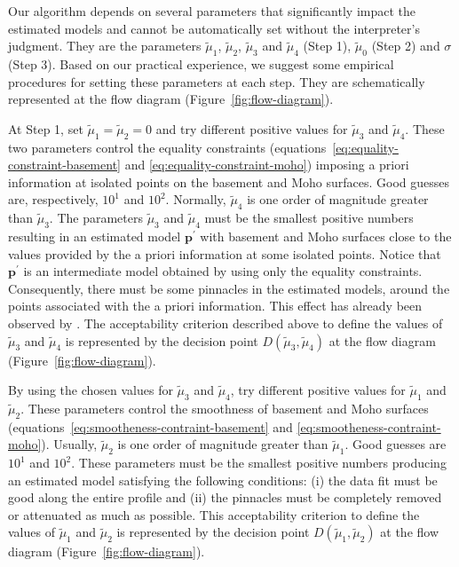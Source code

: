 \documentclass[manuscript,revised]{geophysics}
\begin{document}
Our algorithm depends on several parameters that significantly impact the estimated models
and cannot be automatically set without the interpreter’s judgment.
They are the parameters $\tilde{\mu}_{1}$, $\tilde{\mu}_{2}$, $\tilde{\mu}_{3}$ 
and $\tilde{\mu}_{4}$ (Step 1), $\tilde{\mu}_{0}$ (Step 2) and $\sigma$ (Step 3).
Based on our practical experience, we suggest some empirical procedures for setting these
parameters at each step. They are schematically represented at the flow diagram 
(Figure~\ref{fig:flow-diagram}).

At Step 1, set $\tilde{\mu}_{1} = \tilde{\mu}_{2} = 0$ and try different positive 
values for $\tilde{\mu}_{3}$ and $\tilde{\mu}_{4}$. 
These two parameters control the equality constraints
(equations~\ref{eq:equality-constraint-basement} and \ref{eq:equality-constraint-moho})
imposing a priori information at isolated points on the basement and Moho surfaces.
Good guesses are, respectively,
$10^{1}$ and $10^{2}$. Normally, $\tilde{\mu}_{4}$ is one order of magnitude greater
than $\tilde{\mu}_{3}$. 
The parameters $\tilde{\mu}_{3}$ and $\tilde{\mu}_{4}$ 
must be the smallest positive numbers resulting in an estimated model $\mathbf{p}^{\prime}$ 
with basement and Moho surfaces close to the values provided by the a priori information
at some isolated points. Notice that $\mathbf{p}^{\prime}$ is an intermediate model 
obtained by using only the equality constraints. Consequently, there must be some
pinnacles in the estimated models, around the points associated with the a priori 
information. This effect has already been observed by \citet{barbosa-etal1997}.
The acceptability criterion described above to define the values of $\tilde{\mu}_{3}$ and 
$\tilde{\mu}_{4}$ is represented by the decision point $D(\tilde{\mu}_{3}, \tilde{\mu}_{4})$ 
at the flow diagram (Figure~\ref{fig:flow-diagram}).

By using the chosen values for $\tilde{\mu}_{3}$ and $\tilde{\mu}_{4}$, 
try different positive values for $\tilde{\mu}_{1}$ and $\tilde{\mu}_{2}$.
These parameters control the smoothness of basement and Moho surfaces
(equations~\ref{eq:smootheness-contraint-basement} and \ref{eq:smootheness-contraint-moho}).
Usually, $\tilde{\mu}_{2}$ is one order of magnitude greater than $\tilde{\mu}_{1}$.
Good guesses are $10^{1}$ and $10^{2}$.
These parameters must be the smallest positive numbers producing an estimated model
satisfying the following conditions: (i) the data fit must be good along the entire profile
and (ii) the pinnacles must be completely removed or attenuated as much as possible.
This acceptability criterion to define the values of $\tilde{\mu}_{1}$ and 
$\tilde{\mu}_{2}$ is represented by the decision point $D(\tilde{\mu}_{1}, \tilde{\mu}_{2})$ 
at the flow diagram (Figure~\ref{fig:flow-diagram}).
\end{document}
